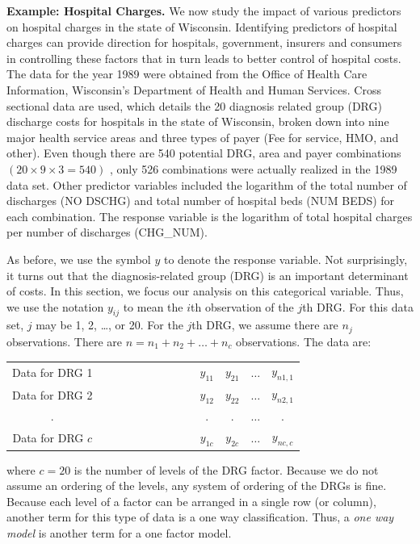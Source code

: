 \textbf{Example: Hospital Charges.} We
now study the impact of various predictors on hospital charges in
the state of Wisconsin. Identifying predictors of hospital charges
can provide direction for hospitals, government, insurers and
consumers in controlling these factors that in turn leads to better
control of hospital costs. The data for the year 1989 were obtained
from the Office of Health Care Information, Wisconsin's Department
of Health and Human Services. Cross sectional data are used, which
details the 20 diagnosis related group (DRG) discharge costs for
hospitals in the state of Wisconsin, broken down into nine major
health service areas and three types of payer (Fee for service, HMO,
and other). Even though there
are 540 potential DRG, area and payer combinations $(20\times 9\times 3=540)$%
, only 526 combinations were actually realized in the 1989 data set. Other
predictor variables included the logarithm of the total number of discharges
(NO DSCHG) and total number of hospital beds (NUM BEDS) for each
combination. The response variable is the logarithm of total hospital
charges per number of discharges (CHG\_NUM).

As before, we use the symbol $y$ to denote the response variable.
Not surprisingly, it turns out that the diagnosis-related group
(DRG) is an important determinant of costs. In this section, we
focus our analysis on this categorical variable. Thus, we use the
notation $y_{ij}$ to mean the $i$th observation of the $j$th DRG.
For this data set, $j$ may be 1, 2, \ldots , or 20. For the $j$th
DRG, we assume there are $n_{j}$ observations. There are
$n=n_1+n_2+\ldots +n_{c}$ observations. The data are:

\begin{center}
\begin{tabular}{cccccc}
Data for DRG 1 & \ \ \ \ \ \ \ \ \ \ \ \ \ \ \  & $y_{11}$ & $y_{21}$ & $%
\ldots $ & $y_{n1,1}$ \\
Data for DRG 2 &  & $y_{12}$ & $y_{22}$ & $\ldots $ & $y_{n2,1}$ \\
. &  & $.$ & $.$ & $\ldots$ & $.$ \\
Data for DRG $c$ &  & $y_{1c}$ & $y_{2c}$ & $\ldots $ & $y_{nc,c}$%
\end{tabular}
\end{center}

\noindent where $c=20$ is the number of levels of the DRG factor.
Because we do not assume an ordering of the levels, any system of
ordering of the DRGs is fine. Because each level of a factor can be
arranged in a single row (or column), another term for this type of
data is a one way classification. Thus, a \textit{one way model} is
another term for a one factor model.

